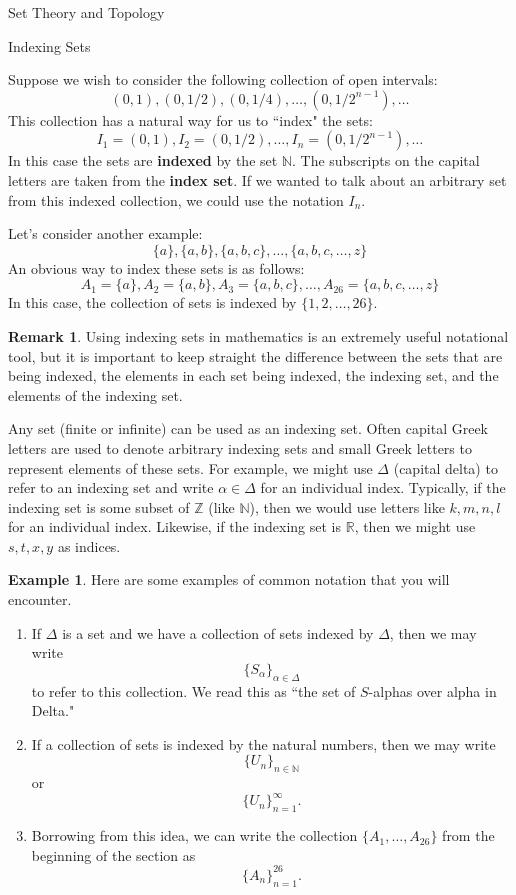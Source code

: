 \documentclass[11pt]{article}
\theoremstyle{definition}
\newtheorem{example}[theorem]{Example}
\newtheorem{remark}[theorem]{Remark}
\begin{document}
\addtocounter{section}{1}

\begin{section}{Set Theory and Topology}

\addtocounter{subsection}{2}
\addtocounter{theorem}{43}

\begin{subsection}{Indexing Sets}

Suppose we wish to consider the following collection of open intervals:
\[
(0,1), (0,1/2), (0,1/4), \ldots, (0,1/2^{n-1}), \ldots
\]
This collection has a natural way for us to ``index" the sets:
\[
I_1=(0,1), I_2=(0,1/2), \ldots, I_n=(0,1/2^{n-1}), \ldots
\]
In this case the sets are \textbf{indexed} by the set $\mathbb{N}$.  The subscripts on the capital letters are taken from the \textbf{index set}.  If we wanted to talk about an arbitrary set from this indexed collection, we could use the notation $I_n$.

Let's consider another example:
\[
\{a\}, \{a,b\}, \{a,b,c\}, \ldots, \{a,b,c,\ldots,z\}
\]
An obvious way to index these sets is as follows:
\[
A_1=\{a\}, A_2=\{a,b\}, A_3=\{a,b,c\}, \ldots, A_{26}=\{a,b,c,\ldots,z\}
\]
In this case, the collection of sets is indexed by $\{1,2,\ldots, 26\}$.

\begin{remark}
Using indexing sets in mathematics is an extremely useful notational tool, but it is important to keep straight the difference between the sets that are being indexed, the elements in each set being indexed, the indexing set, and the elements of the indexing set.
\end{remark}

Any set (finite or infinite) can be used as an indexing set.  Often capital Greek letters are used to denote arbitrary indexing sets and small Greek letters to represent elements of these sets.  For example, we might use $\Delta$ (capital delta) to refer to an indexing set and write $\alpha \in \Delta$ for an individual index.  Typically, if the indexing set is some subset of $\mathbb{Z}$ (like $\mathbb{N}$), then we would use letters like $k,m,n,l$ for an individual index.  Likewise, if the indexing set is $\mathbb{R}$, then we might use $s,t,x,y$ as indices.  

\begin{example}
Here are some examples of common notation that you will encounter.
\begin{enumerate}
\item If $\Delta$ is a set and we have a collection of sets indexed by $\Delta$, then we may write
\[
\{S_{\alpha}\}_{\alpha\in \Delta}
\]
to refer to this collection.  We read this as ``the set of $S$-alphas over alpha in Delta."
\item If a collection of sets is indexed by the natural numbers, then we may write
\[
\{U_n\}_{n\in\mathbb{N}}
\]
or
\[
\{U_n\}_{n=1}^{\infty}.
\]
\item Borrowing from this idea, we can write the collection $\{A_1,\ldots,A_{26}\}$ from the beginning of the section as
\[
\{A_n\}_{n=1}^{26}.
\]


\end{enumerate}
\end{example}
\end{subsection}
\end{section}
\end{document}
